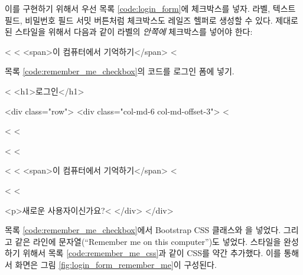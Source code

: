{{이를 구현하기 위해서 우선 목록 \ref{code:login_form}에 체크박스를 넣자. 라벨, 텍스트 필드, 비밀번호 필드 서밋 버튼처럼 체크박스도 레일즈 헬퍼로 생성할 수 있다. 제대로 된 스타일을 위해서 다음과 같이 라벨의 \emph{안쪽에} 체크박스를 넣어야 한다: 

\begin{code} < < <span>이 컴퓨터에서 기억하기</span> < \end{code} 

\noindent 목록 \ref{code:remember_me_checkbox}의 코드를 로그인 폼에 넣기. 

\begin{codelisting} \label{code:remember_me_checkbox}  

\begin{code} < <h1>로그인</h1> 

<div class="row"> <div class="col-md-6 col-md-offset-3"> < 

< < 

< < 

< < <span>이 컴퓨터에서 기억하기</span> < 

< < 

<p>새로운 사용자이신가요?< </div> </div> \end{code} \end{codelisting} 

목록 \ref{code:remember_me_checkbox}에서 Bootstrap CSS 클래스와 을 넣었다. 그리고 같은 라인에 문자열(``Remember me on this computer'')도 넣었다. 스타일을 완성하기 위해서 목록 \ref{code:remember_me_css}과 같이 CSS를 약간 추가했다. 이를 통해서 화면은 그림 \ref{fig:login_form_remember_me}이 구성된다. 

\begin{codelisting} \label{code:remember_me_css}  


\end{codelisting}}}

